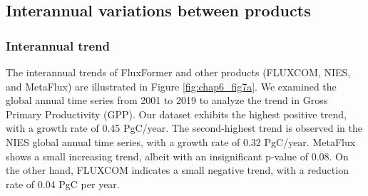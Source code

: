 \subsection{Interannual variations between products}
\subsubsection*{Interannual trend}

The interannual trends of FluxFormer and other products (FLUXCOM, NIES, and MetaFlux) are illustrated in Figure \ref{fig:chap6_fig7a}. We examined the global annual time series from 2001 to 2019 to analyze the trend in Gross Primary Productivity (GPP). Our dataset exhibits the highest positive trend, with a growth rate of 0.45 PgC/year. The second-highest trend is observed in the NIES global annual time series, with a growth rate of 0.32 PgC/year. MetaFlux shows a small increasing trend, albeit with an insignificant p-value of 0.08. On the other hand, FLUXCOM indicates a small negative trend, with a reduction rate of 0.04 PgC per year.\par

